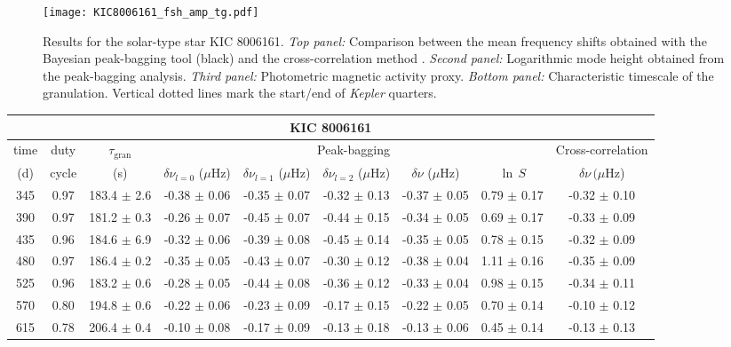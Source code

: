 \documentclass[twocolumn]{aastex61}%
\begin{document}
\begin{figure}[h]
\texttt{[image: KIC8006161\_fsh\_amp\_tg.pdf]}
\caption{Results for the solar-type star KIC 8006161. {\it Top panel:} Comparison between the mean frequency shifts obtained with the Bayesian peak-bagging tool (black) and the cross-correlation method \citep[blue; method described in][]{Kiefer2017}. {\it Second panel:} Logarithmic mode height obtained from the peak-bagging analysis. {\it Third panel:} Photometric magnetic activity proxy. {\it Bottom panel:} Characteristic timescale of the granulation. Vertical dotted lines mark the start/end of {\it Kepler} quarters.}\label{fig:fshKIC8006161}
\end{figure}

\begin{table*}\centering
\fontsize{9}{9.}\selectfont
\begin{tabular}{ccc|ccccc|c}
\multicolumn{9}{c}{KIC 8006161}\\\hline\hline
time&duty&$\tau_\text{gran}$&\multicolumn{5}{c|}{Peak-bagging}&Cross-correlation\\
(d)&cycle& (s)& $\delta\nu_{l=0}$ ($\mu$Hz) & $\delta\nu_{l=1}$ ($\mu$Hz) & $\delta\nu_{l=2}$ ($\mu$Hz) & $\delta\nu$ ($\mu$Hz)& $\ln\,S$ & $\delta\nu\,(\mu$Hz)\\\hline
345 & 0.97 & 183.4 $\pm$ 2.6 & -0.38 $\pm$ 0.06 & -0.35 $\pm$ 0.07 & -0.32 $\pm$ 0.13 & -0.37 $\pm$ 0.05 & 0.79 $\pm$ 0.17 & -0.32 $\pm$ 0.10\\
390 & 0.97 & 181.2 $\pm$ 0.3 & -0.26 $\pm$ 0.07 & -0.45 $\pm$ 0.07 & -0.44 $\pm$ 0.15 & -0.34 $\pm$ 0.05 & 0.69 $\pm$ 0.17 & -0.33 $\pm$ 0.09\\
435 & 0.96 & 184.6 $\pm$ 6.9 & -0.32 $\pm$ 0.06 & -0.39 $\pm$ 0.08 & -0.45 $\pm$ 0.14 & -0.35 $\pm$ 0.05 & 0.78 $\pm$ 0.15 & -0.32 $\pm$ 0.09\\
480 & 0.97 & 186.4 $\pm$ 0.2 & -0.35 $\pm$ 0.05 & -0.43 $\pm$ 0.07 & -0.30 $\pm$ 0.12 & -0.38 $\pm$ 0.04 & 1.11 $\pm$ 0.16 & -0.35 $\pm$ 0.09\\
525 & 0.96 & 183.2 $\pm$ 0.6 & -0.28 $\pm$ 0.05 & -0.44 $\pm$ 0.08 & -0.36 $\pm$ 0.12 & -0.33 $\pm$ 0.04 & 0.98 $\pm$ 0.15 & -0.34 $\pm$ 0.11\\
570 & 0.80 & 194.8 $\pm$ 0.6 & -0.22 $\pm$ 0.06 & -0.23 $\pm$ 0.09 & -0.17 $\pm$ 0.15 & -0.22 $\pm$ 0.05 & 0.70 $\pm$ 0.14 & -0.10 $\pm$ 0.12\\
615 & 0.78 & 206.4 $\pm$ 0.4 & -0.10 $\pm$ 0.08 & -0.17 $\pm$ 0.09 & -0.13 $\pm$ 0.18 & -0.13 $\pm$ 0.06 & 0.45 $\pm$ 0.14 & -0.13 $\pm$ 0.13\\

\end{tabular}
\end{table*}
\end{document}
